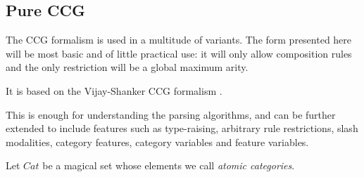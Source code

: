 \documentclass[main.tex]{subfiles}
\begin{document}
\subsection{Pure CCG}
\label{sec:ccg}
The CCG formalism is used in a multitude of variants. The form presented here
will be most basic and of little practical use: it will only allow composition
rules and the only restriction will be a global maximum arity.

It is based on the Vijay-Shanker CCG formalism \cite{shanker}.

This is enough for understanding the parsing algorithms, and can be further
extended to include features such as type-raising,
arbitrary rule restrictions, slash modalities,
category features, category variables and feature variables.

Let $Cat$ be a magical set whose elements we call
\emph{atomic categories}.
\end{document}
